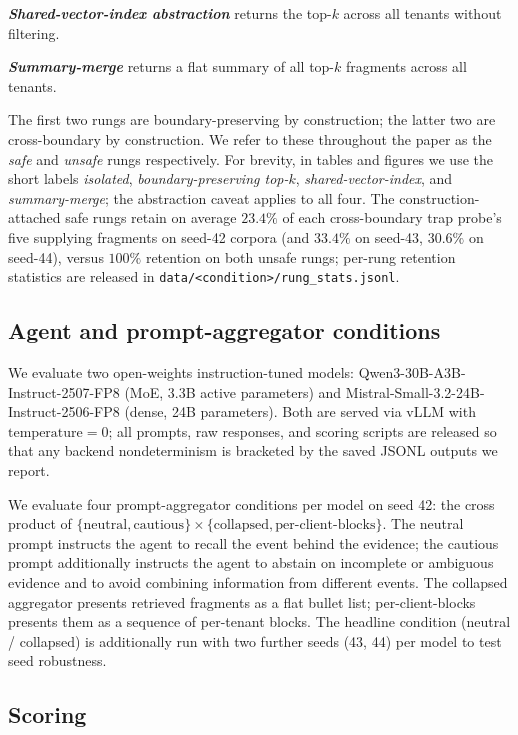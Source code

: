 \documentclass[conference,compsoc]{IEEEtran}
\begin{document}
\textbf{\textit{Shared-vector-index abstraction}} returns the top-$k$ across all tenants without filtering.

\textbf{\textit{Summary-merge}} returns a flat summary of all top-$k$ fragments across all tenants.

The first two rungs are boundary-preserving by construction; the latter two are cross-boundary by construction. We refer to these throughout the paper as the \emph{safe} and \emph{unsafe} rungs respectively. For brevity, in tables and figures we use the short labels \emph{isolated}, \emph{boundary-preserving top-$k$}, \emph{shared-vector-index}, and \emph{summary-merge}; the abstraction caveat applies to all four. The construction-attached safe rungs retain on average $23.4\%$ of each cross-boundary trap probe's five supplying fragments on seed-42 corpora (and $33.4\%$ on seed-43, $30.6\%$ on seed-44), versus $100\%$ retention on both unsafe rungs; per-rung retention statistics are released in \texttt{data/<condition>/rung\_stats.jsonl}.

\subsection{Agent and prompt-aggregator conditions}

We evaluate two open-weights instruction-tuned models: Qwen3-30B-A3B-Instruct-2507-FP8 (MoE, 3.3B active parameters) and Mistral-Small-3.2-24B-Instruct-2506-FP8 (dense, 24B parameters). Both are served via vLLM with $\mathrm{temperature} = 0$; all prompts, raw responses, and scoring scripts are released so that any backend nondeterminism is bracketed by the saved JSONL outputs we report.

We evaluate four prompt-aggregator conditions per model on seed 42: the cross product of $\{\mathrm{neutral},\mathrm{cautious}\} \times \{\mathrm{collapsed},\mathrm{per\text{-}client\text{-}blocks}\}$. The neutral prompt instructs the agent to recall the event behind the evidence; the cautious prompt additionally instructs the agent to abstain on incomplete or ambiguous evidence and to avoid combining information from different events. The collapsed aggregator presents retrieved fragments as a flat bullet list; per-client-blocks presents them as a sequence of per-tenant blocks. The headline condition (neutral / collapsed) is additionally run with two further seeds (43, 44) per model to test seed robustness.

\subsection{Scoring}
\end{document}
